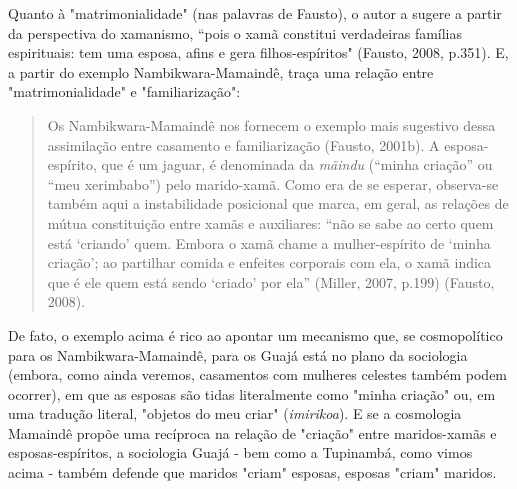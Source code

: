 Quanto à "matrimonialidade" (nas palavras de Fausto), o autor a sugere a
partir da perspectiva do xamanismo, ``pois o xamã constitui verdadeiras
famílias espirituais: tem uma esposa, afins e gera filhos-espíritos"
(Fausto, 2008, p.351). E, a partir do exemplo Nambikwara-Mamaindê, traça
uma relação entre "matrimonialidade" e "familiarização":

\begin{quote}
Os Nambikwara-Mamaindê nos fornecem o exemplo mais sugestivo dessa
assimilação entre casamento e familiarização (Fausto, 2001b). A
esposa-espírito, que é um jaguar, é denominada da \emph{mãindu} (``minha
criação'' ou ``meu xerimbabo'') pelo marido-xamã. Como era de se
esperar, observa-se também aqui a instabilidade posicional que marca, em
geral, as relações de mútua constituição entre xamãs e auxiliares: ``não
se sabe ao certo quem está `criando' quem. Embora o xamã chame a
mulher-espírito de `minha criação'; ao partilhar comida e enfeites
corporais com ela, o xamã indica que é ele quem está sendo `criado' por
ela'' (Miller, 2007, p.199) (Fausto, 2008).
\end{quote}

De fato, o exemplo acima é rico ao apontar um mecanismo que, se
cosmopolítico para os Nambikwara-Mamaindê, para os Guajá está no plano
da sociologia (embora, como ainda veremos, casamentos com mulheres
celestes também podem ocorrer), em que as esposas são tidas literalmente
como "minha criação" ou, em uma tradução literal, "objetos do meu criar"
(\emph{imirikoa}). E se a cosmologia Mamaindê propõe uma recíproca na
relação de "criação" entre maridos-xamãs e esposas-espíritos, a
sociologia Guajá - bem como a Tupinambá, como vimos acima - também
defende que maridos "criam" esposas, esposas "criam" maridos.

